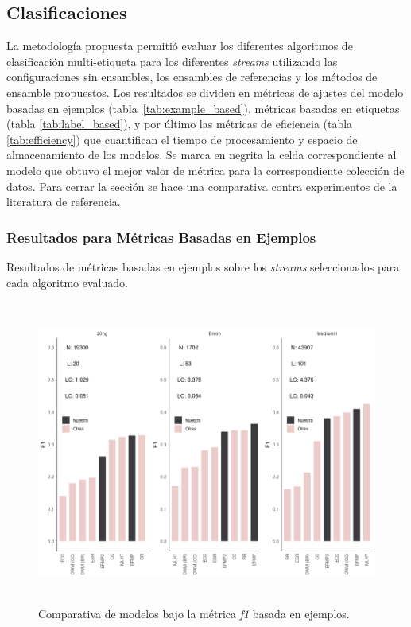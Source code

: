 \subsection{Clasificaciones}
\label{experimentos_clasificaciones}

La metodología propuesta permitió evaluar los diferentes algoritmos de
clasificación multi-etiqueta para los diferentes \textit{streams} utilizando las
configuraciones sin ensambles, los ensambles de referencias y los métodos de
ensamble propuestos. Los resultados se dividen en métricas de ajustes del modelo
basadas en ejemplos (tabla~\ref{tab:example_based}), métricas basadas en
etiquetas (tabla \ref{tab:label_based}), y por último las métricas de eficiencia
(tabla \ref{tab:efficiency}) que cuantifican el tiempo de procesamiento y
espacio de almacenamiento de los modelos. Se marca en negrita la celda
correspondiente al modelo que obtuvo el mejor valor de métrica para la
correspondiente colección de datos. Para cerrar la sección se hace una
comparativa contra experimentos de la literatura de referencia.

\subsubsection{Resultados para Métricas Basadas en Ejemplos}

\begin{table}[htbp]
	\centering
	\begin{adjustbox}{max width=\textwidth}
		
	\end{adjustbox}
	\begin{adjustbox}{max width=\textwidth}
		
	\end{adjustbox}
	\caption{Resultados de métricas basadas en ejemplos sobre los
		\textit{streams} seleccionados para cada algoritmo evaluado.}
	\label{tab:example_based}
\end{table}

\begin{figure}
	\includegraphics[width=\linewidth,height=10cm]{figures/experiments/classification/f1_ex.png}
	\caption{Comparativa de modelos bajo la métrica \textit{f1} basada en
		ejemplos.}
	\label{fig:comparativa_f1_ex}
\end{figure}

